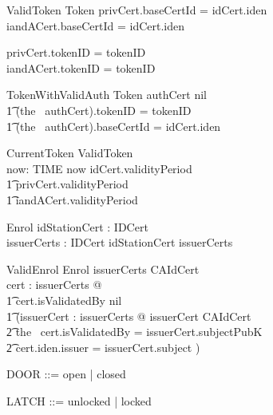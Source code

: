 \begin{schema}{ValidToken}
	Token
\where
	privCert.baseCertId = idCert.iden
\\	iandACert.baseCertId = idCert.iden

\also	privCert.tokenID = tokenID
\\	iandACert.tokenID = tokenID
\end{schema}

\begin{schema}{TokenWithValidAuth}
	Token
\where
        authCert \neq nil 
\\      \t1    \land  (the~ authCert).tokenID = tokenID
\\	\t1    \land  (the~ authCert).baseCertId = idCert.iden
\end{schema}

\begin{schema}{CurrentToken}
	ValidToken
\\	now: TIME
\where
	now \in idCert.validityPeriod
\\ \t1		{} \cap privCert.validityPeriod
\\ \t1		{} \cap iandACert.validityPeriod
\end{schema}

\begin{schema}{Enrol}
        idStationCert : IDCert
\\      issuerCerts : \power IDCert
\where
        idStationCert \in issuerCerts
\end{schema}

\begin{schema}{ValidEnrol}
        Enrol
\where
        issuerCerts \cap CAIdCert  \neq \emptyset
\also
\\      \forall cert : issuerCerts @ 
\\      \t1     cert.isValidatedBy \neq nil 
\\      \t1     \land (\exists issuerCert : issuerCerts @ 
        issuerCert \in CAIdCert 
\\      \t2     \land the~ cert.isValidatedBy = issuerCert.subjectPubK
\\      \t2     \land cert.iden.issuer = issuerCert.subject )   
\end{schema}

\begin{zed}
	DOOR ::= open | closed
\also
\end{zed}

\begin{zed}
	LATCH ::= unlocked | locked
\also
\end{zed}


